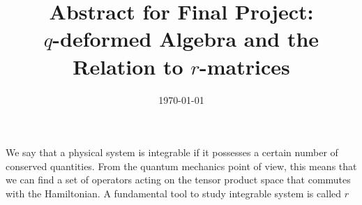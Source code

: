 

\title{Abstract for Final Project:\\ $q$-deformed Algebra and the Relation to $r$-matrices}
\date{\today}




We say that a physical system is integrable if it possesses a certain number of conserved quantities. From the quantum mechanics point of view, this means that we can find a set of operators acting on the tensor product space that commutes with the Hamiltonian. A fundamental tool to study integrable system is called $r$



